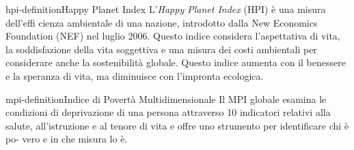 \documentclass[preview]{standalone}
\begin{document}
\begin{snippetdefinition}{hpi-definition}{Happy Planet Index}
    L'\textit{Happy Planet Index} (HPI) è una misura dell'effi cienza ambientale di una nazione,
    introdotto dalla New Economics Foundation
    (NEF) nel luglio 2006. Questo indice considera l'aspettativa di vita, la soddisfazione
    della vita soggettiva e una misura dei costi ambientali per considerare
    anche la sostenibilità globale.
    Questo indice aumenta con il benessere e la speranza di vita,
    ma diminuisce con l'impronta ecologica.
\end{snippetdefinition}


\begin{snippetdefinition}{mpi-definition}{Indice di Povertà Multidimensionale}
    Il MPI globale esamina le condizioni
    di deprivazione di una persona attraverso 10 indicatori relativi alla salute,
    all'istruzione e al tenore di vita e offre uno strumento per identificare chi è po-
    vero e in che misura lo è.
\end{snippetdefinition}
\end{document}
